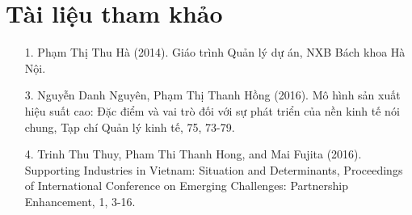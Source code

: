 \documentclass[a4paper]{book}
\begin{document}
\chapter*{Tài liệu tham khảo}
\begin{itemize}
    \item [1.] Phạm Thị Thu Hà (2014). Giáo trình Quản lý dự án, NXB Bách khoa Hà Nội.
    \item [3.] Nguyễn Danh Nguyên, Phạm Thị Thanh Hồng (2016). Mô hình sản xuất hiệu suất cao: Đặc điểm và vai trò đối với sự phát triển của nền kinh tế nói chung, Tạp chí Quản lý kinh tế, 75, 73-79.
    \item [4.] Trinh Thu Thuy, Pham Thi Thanh Hong, and Mai Fujita (2016). Supporting Industries in Vietnam: Situation and Determinants, Proceedings of International Conference on Emerging Challenges: Partnership Enhancement, 1, 3-16.
\end{itemize}
\end{document}
